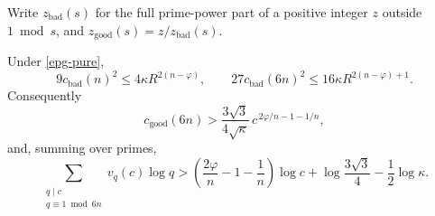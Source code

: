 Write $z_{\mathrm{bad}}(s)$ for the full prime-power part of a
positive integer $z$ outside $1\bmod s$, and
$z_{\mathrm{good}}(s)=z/z_{\mathrm{bad}}(s)$.
\begin{theorem}
\label{epg-support-budget}
Under \eqref{epg-pure},
\begin{equation}\label{epg-integer-budgets}
 9c_{\mathrm{bad}}(n)^2\le4\kappa R^{2(n-\varphi)},\qquad
 27c_{\mathrm{bad}}(6n)^2\le16\kappa R^{2(n-\varphi)+1}.
\end{equation}
Consequently
\begin{equation}\label{epg-good-part}
 c_{\mathrm{good}}(6n)>
 \frac{3\sqrt3}{4\sqrt\kappa}\,
       c^{\,2\varphi/n-1-1/n},
\end{equation}
and, summing over primes,
\begin{equation}\label{epg-mass}
 \sum_{\substack{q\mid c\\q\equiv1\bmod6n}}v_q(c)\log q
 >
 \left(\frac{2\varphi}{n}-1-\frac1n\right)\log c
 +\log\frac{3\sqrt3}{4}-\frac12\log\kappa.
\end{equation}
\end{theorem}
